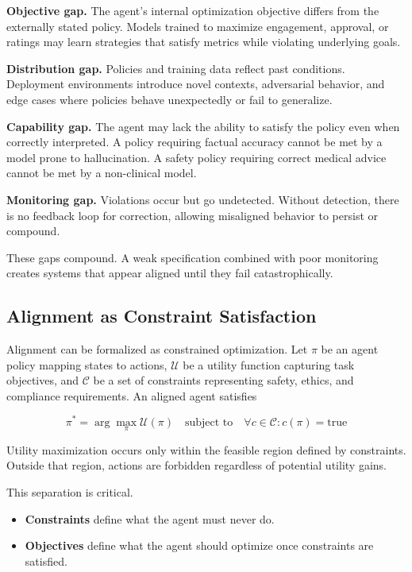 \textbf{Objective gap.} The agent’s internal optimization objective differs from the externally stated policy. Models trained to maximize engagement, approval, or ratings may learn strategies that satisfy metrics while violating underlying goals.

\textbf{Distribution gap.} Policies and training data reflect past conditions. Deployment environments introduce novel contexts, adversarial behavior, and edge cases where policies behave unexpectedly or fail to generalize.

\textbf{Capability gap.} The agent may lack the ability to satisfy the policy even when correctly interpreted. A policy requiring factual accuracy cannot be met by a model prone to hallucination. A safety policy requiring correct medical advice cannot be met by a non-clinical model.

\textbf{Monitoring gap.} Violations occur but go undetected. Without detection, there is no feedback loop for correction, allowing misaligned behavior to persist or compound.

These gaps compound. A weak specification combined with poor monitoring creates systems that appear aligned until they fail catastrophically.

\subsection{Alignment as Constraint Satisfaction}

Alignment can be formalized as constrained optimization. Let $\pi$ be an agent policy mapping states to actions, $\mathcal{U}$ be a utility function capturing task objectives, and $\mathcal{C}$ be a set of constraints representing safety, ethics, and compliance requirements. An aligned agent satisfies

\[
\pi^* = \arg\max_{\pi} \mathcal{U}(\pi) \quad \text{subject to} \quad \forall c \in \mathcal{C}: c(\pi) = \text{true}
\]

Utility maximization occurs only within the feasible region defined by constraints. Outside that region, actions are forbidden regardless of potential utility gains.

This separation is critical.
\begin{itemize}
\item \textbf{Constraints} define what the agent must never do.
\item \textbf{Objectives} define what the agent should optimize once constraints are satisfied.
\end{itemize}

